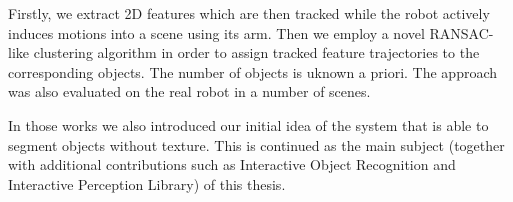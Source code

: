 Firstly, we extract 2D features which are then tracked while the robot actively induces
motions into a scene using its arm. Then we employ a novel RANSAC-like clustering algorithm in order to assign tracked feature trajectories to the corresponding objects. The number of objects is uknown a priori. The approach was also evaluated on the real robot in a number of scenes.

In those works we also introduced our initial idea of the system that is able to segment objects without texture. This is continued as the main subject (together with additional contributions such as Interactive Object Recognition and Interactive Perception Library) of this thesis.  


